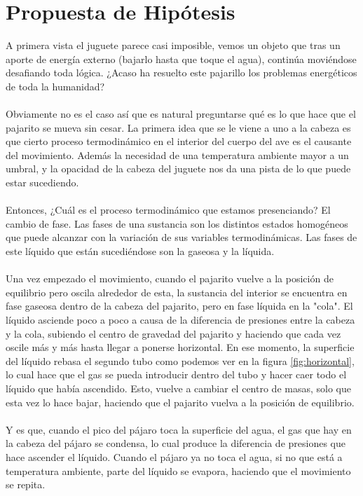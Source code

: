 \section{Propuesta de Hipótesis}
    A primera vista el juguete parece casi imposible, vemos un objeto que tras un aporte de energía externo (bajarlo hasta que toque el agua), continúa moviéndose desafiando toda lógica. ¿Acaso ha resuelto este pajarillo los problemas energéticos de toda la humanidad?\\ \\Obviamente no es el caso así que es natural preguntarse qué es lo que hace que el pajarito se mueva sin cesar. La primera idea que se le viene a uno a la cabeza es que cierto proceso termodinámico en el interior del cuerpo del ave es el causante del movimiento. Además la necesidad de una temperatura ambiente mayor a un umbral, y la opacidad de la cabeza del juguete nos da una pista de lo que puede estar sucediendo.\\ \\Entonces, ¿Cuál es el proceso termodinámico que estamos presenciando? El cambio de fase. Las fases de una sustancia son los distintos estados homogéneos que puede alcanzar con la variación de sus variables termodinámicas. Las fases de este líquido que están sucediéndose son la gaseosa y la líquida.\\ \\Una vez empezado el movimiento, cuando el pajarito vuelve a la posición de equilibrio pero oscila alrededor de esta, la sustancia del interior se encuentra en fase gaseosa dentro de la cabeza del pajarito, pero en fase líquida en la "cola". El líquido asciende poco a poco a causa de la diferencia de presiones entre la cabeza y la cola, subiendo el centro de gravedad del pajarito y haciendo que cada vez oscile más y más hasta llegar a ponerse horizontal. En ese momento, la superficie del líquido rebasa el segundo tubo como podemos ver en la figura \ref{fig:horizontal}, lo cual hace que el gas se pueda introducir dentro del tubo y hacer caer todo el líquido que había ascendido. Esto, vuelve a cambiar el centro de masas, solo que esta vez lo hace bajar, haciendo que el pajarito vuelva a la posición de equilibrio.\\ \\Y es que, cuando el pico del pájaro toca la superficie del agua, el gas que hay en la cabeza del pájaro se condensa, lo cual produce la diferencia de presiones que hace ascender el líquido. Cuando el pájaro ya no toca el agua, si no que está a temperatura ambiente, parte del líquido se evapora, haciendo que el movimiento se repita.
